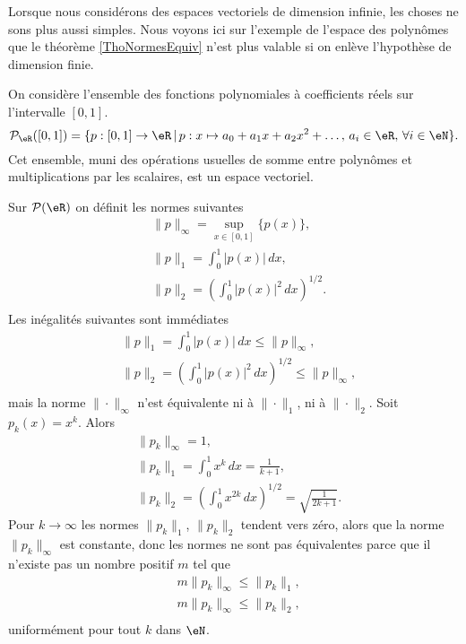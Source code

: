 Lorsque nous considérons des espaces vectoriels de dimension infinie, les choses ne sons plus aussi simples. Nous voyons ici sur l'exemple de l'espace des polynômes que le théorème \ref{ThoNormesEquiv} n'est plus valable si on enlève l'hypothèse de dimension finie.

On considère l'ensemble des fonctions polynomiales à coefficients réels sur  l'intervalle $[0,1]$.
\begin{equation}
\mathcal{P}_\eR([0,1])=\{p:[0,1]\to \eR\,|\, p : x\mapsto a_0+a_1 x +a_2 x^2 + \ldots, \, a_i\in\eR,\,\forall i\in \eN\}.
\end{equation}
Cet ensemble, muni des opérations usuelles de somme entre polynômes et multiplications par les scalaires, est un espace vectoriel.  

Sur $\mathcal{P}(\eR)$ on définit les normes suivantes 
\begin{equation}
\begin{aligned}
&\|p\|_\infty=\sup_{x\in[0,1]}\{p(x)\},\\
&\|p\|_1 =\int_0^1|p(x)|\, dx,\\
&\|p\|_2 =\left(\int_0^1|p(x)|^2\, dx\right)^{1/2}.\\
\end{aligned}
\end{equation}
Les inégalités suivantes sont  immédiates
\begin{equation}
\begin{aligned}
&\|p\|_1 =\int_0^1|p(x)|\, dx\leq \|p\|_\infty,\\
&\|p\|_2 =\left(\int_0^1|p(x)|^2\, dx\right)^{1/2}\leq \|p\|_\infty,\\
\end{aligned}
\end{equation}
mais la norme $\|\cdot\|_\infty$ n'est  équivalente ni à $\|\cdot\|_1$, ni à $\|\cdot\|_2$. Soit $p_k(x)= x^k$. Alors
\begin{equation}
\begin{aligned}
&\|p_k\|_\infty=1,\\
&\|p_k\|_1 =\int_0^1x^k\, dx=  \frac{1}{k+1},\\
&\|p_k\|_2 =\left(\int_0^1x^{2k}\, dx\right)^{1/2}=\sqrt{\frac{1}{2k+1}}.
\end{aligned}
\end{equation}
Pour $k\to \infty$ les normes $\|p_k\|_1$, $\|p_k\|_2$ tendent vers zéro, alors que la norme $\|p_k\|_\infty$ est constante, donc les normes ne sont pas équivalentes parce que il n'existe pas un nombre positif $m$ tel que 
\begin{equation}
\begin{aligned}
& m \|p_k\|_\infty\leq \|p_k\|_1 ,\\
& m \|p_k\|_\infty\leq \|p_k\|_2 ,\\
\end{aligned}
\end{equation}
uniformément pour tout $k$ dans $\eN$.

